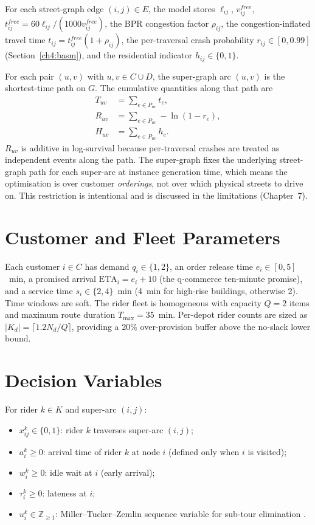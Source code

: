For each street-graph edge $(i,j) \in E$, the model stores
$\ell_{ij}$, $v_{ij}^{free}$,
$t_{ij}^{free} = 60\ell_{ij}/(1000 v_{ij}^{free})$, the BPR
congestion factor $\rho_{ij}$, the congestion-inflated travel time
$t_{ij} = t_{ij}^{free}(1 + \rho_{ij})$, the per-traversal crash
probability $r_{ij} \in [0, 0.99]$ (Section~\ref{ch4:basm}), and the
residential indicator $h_{ij} \in \{0,1\}$.

For each pair $(u, v)$ with $u, v \in C \cup D$, the super-graph arc
$(u, v)$ is the shortest-time path on $G$. The cumulative quantities
along that path are
\begin{align}
T_{uv} &= \sum_{e \in P_{uv}} t_e, \label{eq:Tuv} \\
R_{uv} &= \sum_{e \in P_{uv}} -\ln(1-r_e), \label{eq:Ruv} \\
H_{uv} &= \sum_{e \in P_{uv}} h_e. \label{eq:Huv}
\end{align}
$R_{uv}$ is additive in log-survival because per-traversal crashes
are treated as independent events along the path. The super-graph
fixes the underlying street-graph path for each super-arc at instance
generation time, which means the optimisation is over customer
\emph{orderings}, not over which physical streets to drive on. This
restriction is intentional and is discussed in the limitations
(Chapter~7).

\section{Customer and Fleet Parameters}

Each customer $i \in C$ has demand $q_i \in \{1,2\}$, an order
release time $e_i \in [0, 5]$~min, a promised arrival
$\mathrm{ETA}_i = e_i + 10$ (the q-commerce ten-minute promise), and
a service time $s_i \in \{2, 4\}$~min (4~min for high-rise buildings,
otherwise 2). Time windows are soft. The rider fleet is homogeneous
with capacity $Q = 2$ items and maximum route duration
$T_{\max} = 35$~min. Per-depot rider counts are sized as
$|K_d| = \lceil 1.2 N_d / Q \rceil$, providing a 20\% over-provision
buffer above the no-slack lower bound.

\section{Decision Variables}

For rider $k \in K$ and super-arc $(i, j)$:
\begin{itemize}
    \item $x_{ij}^k \in \{0, 1\}$: rider $k$ traverses super-arc $(i, j)$;
    \item $a_i^k \geq 0$: arrival time of rider $k$ at node $i$ (defined only when $i$ is visited);
    \item $w_i^k \geq 0$: idle wait at $i$ (early arrival);
    \item $\tau_i^k \geq 0$: lateness at $i$;
    \item $u_i^k \in \mathbb{Z}_{\geq 1}$: Miller--Tucker--Zemlin
    sequence variable for sub-tour elimination \citep{miller1960}.
\end{itemize}


